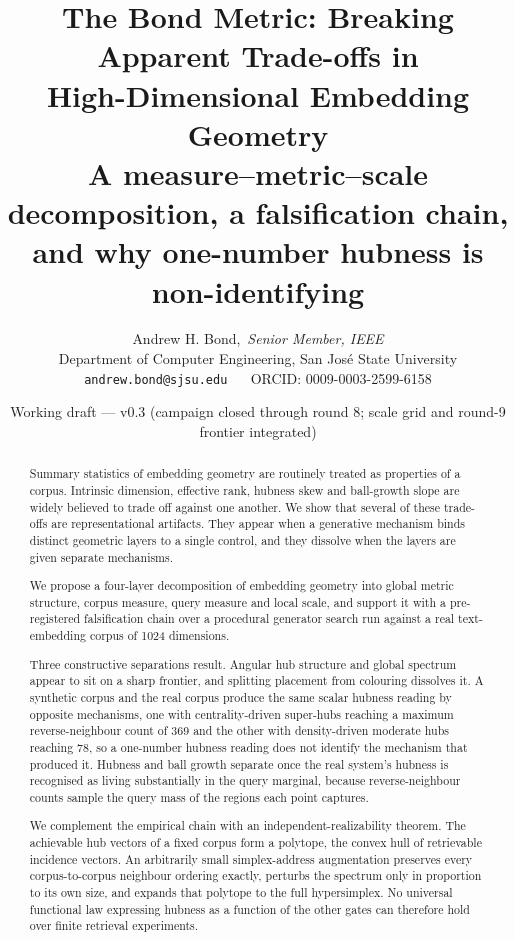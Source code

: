 \documentclass[11pt]{article}
\title{\textbf{The Bond Metric: Breaking Apparent Trade-offs in\\
High-Dimensional Embedding Geometry}\\[4pt]
\large A measure--metric--scale decomposition, a falsification chain,\\
and why one-number hubness is non-identifying}
\author{Andrew H. Bond,~\emph{Senior Member, IEEE}\\
Department of Computer Engineering, San Jos\'e State University\\
\texttt{andrew.bond@sjsu.edu} ~\textbar~ ORCID: 0009-0003-2599-6158}
\date{Working draft --- v0.3 (campaign closed through round 8; scale grid and
round-9 frontier integrated)}
\begin{document}
\maketitle

\begin{abstract}
Summary statistics of embedding geometry are routinely treated as properties
of a corpus. Intrinsic dimension, effective rank, hubness skew and ball-growth
slope are widely believed to trade off against one another. We show that
several of these trade-offs are representational artifacts. They appear when a
generative mechanism binds distinct geometric layers to a single control, and
they dissolve when the layers are given separate mechanisms.

We propose a four-layer decomposition of embedding geometry into global metric
structure, corpus measure, query measure and local scale, and support it with
a pre-registered falsification chain over a procedural generator search run
against a real text-embedding corpus of 1024 dimensions.

Three constructive separations result. Angular hub structure and global
spectrum appear to sit on a sharp frontier, and splitting placement from
colouring dissolves it. A synthetic corpus and the real corpus produce the
same scalar hubness reading by opposite mechanisms, one with centrality-driven
super-hubs reaching a maximum reverse-neighbour count of 369 and the other
with density-driven moderate hubs reaching 78, so a one-number hubness reading
does not identify the mechanism that produced it. Hubness and ball growth
separate once the real system's hubness is recognised as living substantially
in the query marginal, because reverse-neighbour counts sample the query mass
of the regions each point captures.

We complement the empirical chain with an independent-realizability theorem.
The achievable hub vectors of a fixed corpus form a polytope, the convex hull
of retrievable incidence vectors. An arbitrarily small simplex-address
augmentation preserves every corpus-to-corpus neighbour ordering exactly,
perturbs the spectrum only in proportion to its own size, and expands that
polytope to the full hypersimplex. No universal functional law expressing
hubness as a function of the other gates can therefore hold over finite
retrieval experiments.


\end{abstract}
\end{document}
